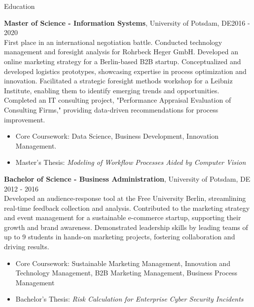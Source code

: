 \documentclass{resume} %
\begin{document}
\begin{rSection}{Education}

{\bf Master of Science - Information Systems}, University of Potsdam, DE\hfill {2016 - 2020}\\
First place in an international negotiation battle. Conducted technology management and foresight analysis for Rohrbeck Heger GmbH. Developed an online marketing strategy for a Berlin-based B2B startup. Conceptualized and developed logistics prototypes, showcasing expertise in process optimization and innovation. Facilitated a strategic foresight methods workshop for a Leibniz Institute, enabling them to identify emerging trends and opportunities. Completed an IT consulting project, "Performance Appraisal Evaluation of Consulting Firms," providing data-driven recommendations for process improvement.
 \begin{itemize}
    \itemsep -2pt {} 
     \item Core Coursework: Data Science, Business Development, Innovation Management.
     \item Master's Thesis: \textit{Modeling of Workflow Processes Aided by Computer Vision}
 \end{itemize}

{\bf Bachelor of Science - Business Administration}, University of Potsdam, DE \hfill {2012 - 2016}\\
Developed an audience-response tool at the Free University Berlin, streamlining real-time feedback collection and analysis.
Contributed to the marketing strategy and event management for a sustainable e-commerce startup, supporting their growth and brand awareness. Demonstrated leadership skills by leading teams of up to 9 students in hands-on marketing projects, fostering collaboration and driving results.
 \begin{itemize}
    \itemsep -2pt {} 
     \item Core Coursework: Sustainable Marketing Management, Innovation and Technology Management, B2B Marketing Management, Business Process Management
     \item Bachelor's Thesis: \textit{Risk Calculation for Enterprise Cyber Security Incidents}
 \end{itemize}


\end{rSection}


\end{document}
